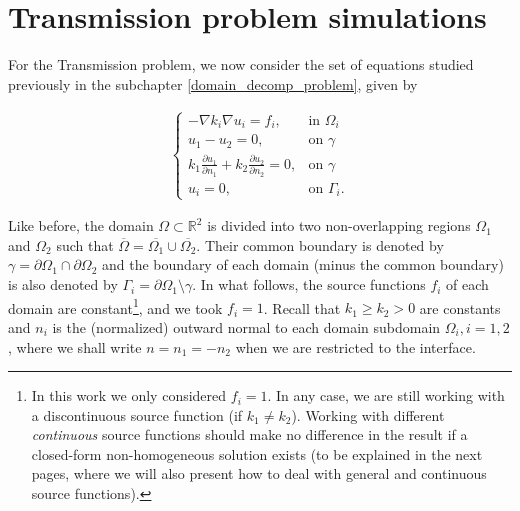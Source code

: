 

\section{Transmission problem simulations}\label{numerical_transmission_simulations}

For the Transmission problem, we now consider the set of equations studied previously in the subchapter \ref{domain_decomp_problem}, given by

\begin{align}\label{transmission_num}
    \begin{cases}
    - \nabla k_i \nabla u_i = f_i, & \text{in }\Omega_i\\
    u_1 - u_2 = 0, & \text{on }\gamma\\
    k_1 \frac{\partial u_1}{\partial n_1} + k_2 \frac{\partial u_2}{\partial n_2} = 0, & \text{on }\gamma\\
    u_i = 0, & \text{on }\Gamma_i.
    \end{cases}
\end{align}

Like before, the domain \(\Omega \subset \mathbb{R}^2\) is divided into two non-overlapping regions \(\Omega_1\) and \(\Omega_2\) such that \(\overline{\Omega} = \overline{\Omega_1} \cup \overline{\Omega_2}\). Their common boundary is denoted by \(\gamma = \partial\Omega_1 \cap \partial\Omega_2\) and the boundary of each domain (minus the common boundary) is also denoted by \(\Gamma_i = \partial\Omega_1\setminus{\gamma}\). In what follows, the source functions \(f_i\) of each domain are constant\footnote{In this work we only considered \(f_i=1\). In any case, we are still working with a discontinuous source function (if \(k_1 \neq k_2\)). Working with different \textit{continuous} source functions should make no difference in the result if a closed-form non-homogeneous solution exists (to be explained in the next pages, where we will also present how to deal with general and continuous source functions).}, and we took \(f_i = 1\). Recall that \(k_1 \geq k_2 > 0\) are constants and \(n_i\) is the (normalized) outward normal to each domain subdomain \(\Omega_i, i=1, 2\), where we shall write \(n=n_1=-n_2\) when we are restricted to the interface.

